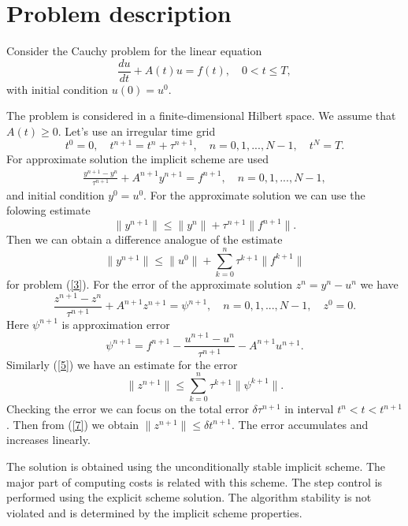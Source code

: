\documentclass[runningheads]{llncs}
\begin{document}
\section{Problem description}
Consider the Cauchy problem for the linear equation
\begin{equation}\label{1}
\frac{du}{dt} + A(t)u =f(t), \quad 0 < t \leq T,
\end{equation}
with initial condition $u(0) = u^0$.

The problem is considered in a finite-dimensional Hilbert space.
We assume that $A(t) \geq 0$.
Let's use an irregular time grid
\[
t^0 = 0, \quad t^{n+1} = t^n + \tau^{n+1}, \quad 
n = 0, 1, ... , N-1, \quad t^N = T.
\]
For approximate solution the implicit scheme are used
\begin{equation}\label{3}
\begin{split}
  \frac{y^{n+1} - y^{n}}{\tau^{n+1}} + A^{n+1} y^{n+1} = f^{n+1},
  \quad n = 0,1, ..., N-1, 
\end{split}
\end{equation}
and initial condition 
$
y^0 = u^0 .
$
For the approximate solution we can use the folowing estimate
\[
 \|y^{n+1}\| \leq \|y^{n}\| + \tau^{n+1} \|f^{n+1}\| .
\]
Then we can obtain a difference analogue of the estimate
\begin{equation}\label{5}
 \|y^{n+1}\| \leq \|u^{0}\| + \sum_{k=0}^{n} \tau^{k+1} \|f^{k+1}\|
\end{equation}
for problem (\ref{3}).
For the error of the approximate solution $z^n = y^n - u^n$ we have
\[
  \frac{z^{n+1} - z^{n}}{\tau^{n+1}} + A^{n+1} z^{n+1} = \psi^{n+1},
  \quad n = 0,1, ..., N-1,  \quad
 z^0 = 0.
\]
Here $\psi^{n+1}$ is approximation error
\begin{equation}\label{6}
 \psi^{n+1} = f^{n+1} -
 \frac{u^{n+1} - u^{n}}{\tau^{n+1}} - A^{n+1} u^{n+1} . 
\end{equation}
Similarly (\ref{5}) we have an estimate for the error
\begin{equation}\label{7}
  \|z^{n+1}\| \leq \sum_{k=0}^{n} \tau^{k+1} \|\psi^{k+1}\| .
\end{equation} 
Checking the error we can focus on the total error $\delta\tau^{n+1}$ in interval $t^n < t < t^{n+1}$. Then from (\ref{7}) we obtain
$\|z^{n+1}\| \leq \delta t^{n+1}.$
The error accumulates and increases linearly.

The solution is obtained using the unconditionally stable implicit scheme.
The major part of computing costs is related with this scheme.
The step control is performed using the explicit scheme solution.
The algorithm stability is not violated and is determined by the implicit scheme properties.
\end{document}
